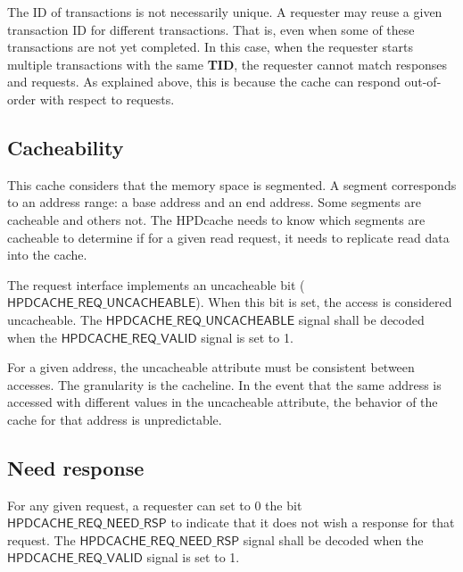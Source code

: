 \documentclass[10pt,titlepage,twoside]{book}
\begin{document}
The ID of transactions is not necessarily unique.
A requester may reuse a given transaction ID for different transactions.
That is, even when some of these transactions are not yet completed.
In this case, when the requester starts multiple transactions with the same \textbf{TID}, the requester cannot match responses and requests.
As explained above, this is because the cache can respond out-of-order with respect to requests.


\subsection{Cacheability}

This cache considers that the memory space is segmented.
A segment corresponds to an address range: a base address and an end address.
Some segments are cacheable and others not.
The \ac{HPDcache} needs to know which segments are cacheable to determine if for a given read request, it needs to replicate read data into the cache.

The request interface implements an uncacheable bit ($\mathsf{HPDCACHE\_REQ\_UNCACHEABLE}$).
When this bit is set, the access is considered uncacheable.
The $\mathsf{HPDCACHE\_REQ\_UNCACHEABLE}$ signal shall be decoded when the $\mathsf{HPDCACHE\_REQ\_VALID}$ signal is set to 1.

\begin{tcolorbox}[colback=red!10!white,
                  colframe=white!10!red,
                  title=\textbf{Important},
                  center, valign=top, halign=left,
                  center title,
                  width=.950\linewidth]
For a given address, the uncacheable attribute must be consistent between accesses.
The granularity is the cacheline.
In the event that the same address is accessed with different values in the uncacheable attribute, the behavior of the cache for that address is unpredictable.
\end{tcolorbox}


\subsection{Need response}%

For any given request, a requester can set to 0 the bit $\mathsf{HPDCACHE\_REQ\_NEED\_RSP}$ to indicate that it does not wish a response for that request.
The $\mathsf{HPDCACHE\_REQ\_NEED\_RSP}$ signal shall be decoded when the $\mathsf{HPDCACHE\_REQ\_VALID}$ signal is set to 1.
\end{document}
